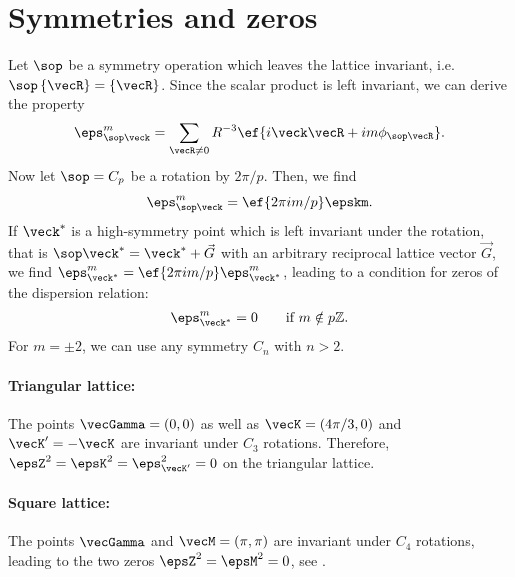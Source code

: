 \section{Symmetries and zeros}
Let $\sop$ be a symmetry operation which leaves the lattice invariant, i.e.~$\sop \, \{ \vecR \} = \{ \vecR \}$.
Since the scalar product is left invariant,
we can derive the property
\begin{align}
    \eps_{\sop\veck}^m = \sum_{\vecR\ne 0} R^{-3} \ef{i\veck \vecR + i m \phi_{\sop\vecR}}.
\end{align}
Now let $\sop=C_p$ be a rotation by $2\pi/p$. Then, we find
\begin{align}
    \eps_{\sop \veck}^m = \ef{2\pi i m/p} \epskm.
\end{align}
If $\veck^*$ is a high-symmetry point which is left invariant under the rotation, that is
$\sop\veck^* = \veck^* + \vec{G}$ with an arbitrary reciprocal lattice vector $\vec{G}$, we find $\eps_{\veck^*}^m = \ef{2\pi i m/p} \eps_{\veck^*}^m$, leading to a condition for zeros of the dispersion relation:
\begin{align}
    \eps^m_{\veck^*} = 0\qquad\text{if } m \notin p\mathbb{Z}.
\end{align}
For $m=\pm 2$, we can use any symmetry $C_n$ with $n>2$.

\paragraph{Triangular lattice:} The points $\vecGamma=(0,0)$ as well as
$\vecK=(4\pi/3,0)$ and $\vecK'=- \vecK$ are invariant under $C_3$ rotations. Therefore,
$\epsZ^2=\epsK^2=\eps^2_{\vecK'}=0$ on the triangular lattice.

\paragraph{Square lattice:} The points $\vecGamma$ and $\vecM=(\pi,\pi)$ are
invariant under $C_4$ rotations, leading to the two zeros $\epsZ^2=\epsM^2=0$, see .


